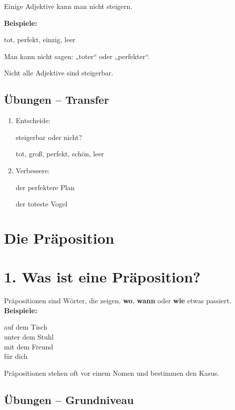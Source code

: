 \documentclass[a4paper,12pt]{article}
\begin{document}
Einige Adjektive kann man nicht steigern.

\textbf{Beispiele:}

tot, perfekt, einzig, leer  

Man kann nicht sagen: „toter“ oder „perfekter“.

\begin{achtung}
Nicht alle Adjektive sind steigerbar.
\end{achtung}

\subsection*{Übungen – Transfer}

\begin{enumerate}
\item Entscheide:

steigerbar oder nicht?

tot, groß, perfekt, schön, leer

\item Verbessere:

der perfektere Plan

der toteste Vogel
\end{enumerate}

\newpage

\section*{Die Präposition}

\section*{1. Was ist eine Präposition?}

Präpositionen sind Wörter, die zeigen, \textbf{wo}, \textbf{wann} oder \textbf{wie} etwas passiert.
\textbf{Beispiele:}

auf dem Tisch\\  
unter dem Stuhl\\  
mit dem Freund\\  
für dich\\  

\begin{merksatz}
Präpositionen stehen oft vor einem Nomen und bestimmen den Kasus.
\end{merksatz}

\subsection*{Übungen – Grundniveau}
\end{document}
